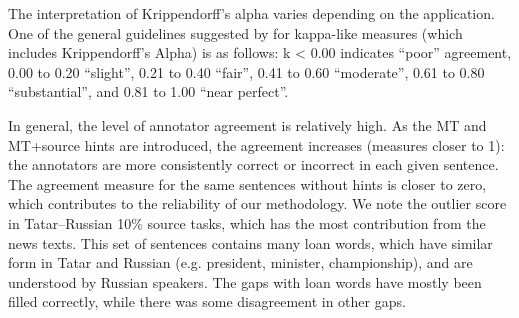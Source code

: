 \documentclass[11pt]{article}
\newcommand{\comment}[1]{}
\begin{document}
The interpretation of Krippendorff's alpha varies depending on the application. One of the general guidelines suggested by \citet{landis77} for kappa-like measures (which includes Krippendorff's Alpha) is as follows: k < 0.00 indicates ``poor'' agreement, 0.00 to 0.20 ``slight'', 0.21 to 0.40 ``fair'', 0.41 to 0.60 ``moderate'', 0.61 to 0.80 ``substantial'', and 0.81 to 1.00 ``near perfect''.

In general, the level of annotator agreement is relatively high. As the MT and MT+source hints are introduced, the agreement increases (measures closer to 1): the annotators are more consistently correct or incorrect in each given sentence. The agreement measure for the same sentences without hints is closer to zero, which contributes to the reliability of our methodology. We note the outlier score in Tatar--Russian 10\% source tasks, which has the most contribution from the news texts. \comment{EA: this Alpha is from a table we do not report here, I added a couple of words to clarify}This set of sentences contains many loan words, which have similar form in Tatar and Russian (e.g. president, minister, championship), and are understood by Russian speakers. The gaps with loan words have mostly been filled correctly, while there was some disagreement in other gaps.

\end{document}

